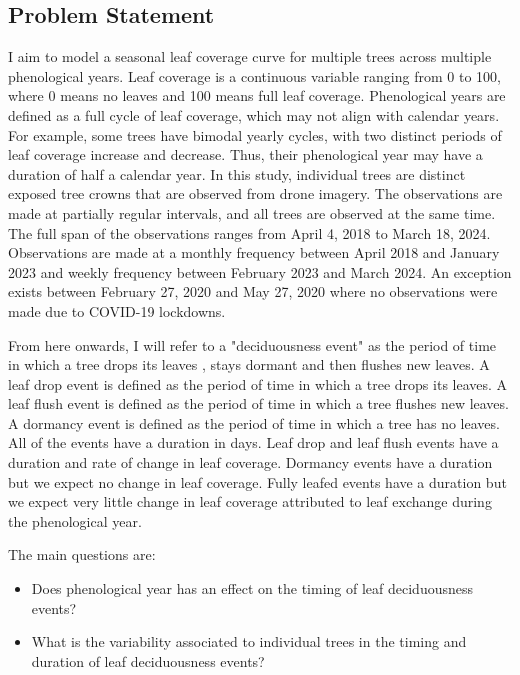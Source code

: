 \documentclass{article}
\begin{document}
\subsection{Problem Statement}
I aim to model a seasonal leaf coverage curve for multiple trees across multiple phenological years.
Leaf coverage is a continuous variable ranging from 0 to 100, where 0 means no leaves and 100 means full leaf coverage.
Phenological years are defined as a full cycle of leaf coverage, which may not align with calendar years.
For example, some trees have bimodal yearly cycles, with two distinct periods of leaf coverage increase and decrease.
Thus, their phenological year may have a duration of half a calendar year.
In this study, individual trees are distinct exposed tree crowns that are observed from drone imagery.
The observations are made at partially regular intervals, and all trees are observed at the same time.
The full span of the observations ranges from  April 4, 2018 to March 18, 2024.
Observations are made at a monthly frequency between April 2018 and January 2023 and 
weekly frequency between February 2023 and March 2024.
An exception exists between February 27, 2020 and May 27, 2020 where no observations were made due to COVID-19 lockdowns.

From here onwards, I will refer to a "deciduousness event" as the period of time in which a tree drops its leaves , stays dormant and then flushes new leaves.
A leaf drop event is defined as the period of time in which a tree drops its leaves.
A leaf flush event is defined as the period of time in which a tree flushes new leaves.
A dormancy event is defined as the period of time in which a tree has no leaves. 
All of the events have a duration in days.
Leaf drop and leaf flush events have a duration and rate of change in leaf coverage.
Dormancy events have a duration but we expect no change in leaf coverage.
Fully leafed events have a duration but we expect very little change in leaf coverage attributed to leaf exchange during the phenological year.



The main questions are:
\begin{itemize}
    \item Does phenological year has an effect on the timing of leaf deciduousness events?
    \item What is the variability associated to individual trees in the timing and duration of leaf deciduousness events?
\end{itemize}
\end{document}
